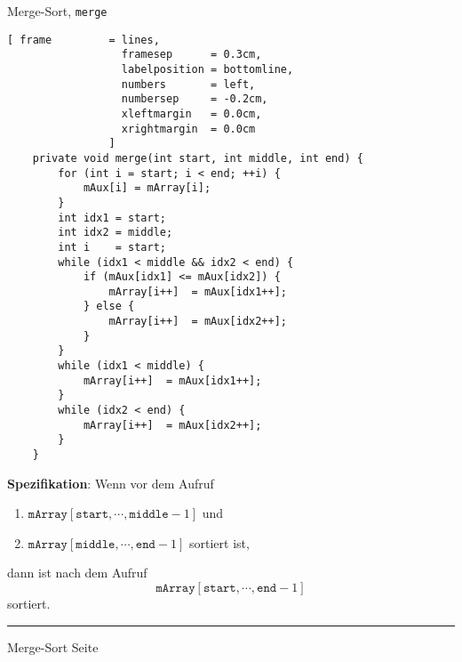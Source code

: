 \documentclass{slides}
\newcounter{mypage}
\begin{document}

\begin{slide}{}
\normalsize

\begin{center}
Merge-Sort,  \texttt{merge}
\end{center}

\footnotesize
\begin{Verbatim}[ frame         = lines, 
                  framesep      = 0.3cm, 
                  labelposition = bottomline,
                  numbers       = left,
                  numbersep     = -0.2cm,
                  xleftmargin   = 0.0cm,
                  xrightmargin  = 0.0cm
                ]
    private void merge(int start, int middle, int end) {    
        for (int i = start; i < end; ++i) {
            mAux[i] = mArray[i]; 
        }
        int idx1 = start;
        int idx2 = middle;
        int i    = start;
        while (idx1 < middle && idx2 < end) {
            if (mAux[idx1] <= mAux[idx2]) {
                mArray[i++]  = mAux[idx1++]; 
            } else {
                mArray[i++]  = mAux[idx2++]; 
            }
        }
        while (idx1 < middle) {
            mArray[i++]  = mAux[idx1++];
        }
        while (idx2 < end) {
            mArray[i++]  = mAux[idx2++];  
        }
    }
\end{Verbatim}

\textbf{Spezifikation}:
Wenn vor dem Aufruf
\begin{enumerate}
\item $\mathtt{mArray}[\mathtt{start}, \cdots, \mathtt{middle}-1]$ und
\item $\mathtt{mArray}[\mathtt{middle}, \cdots, \mathtt{end}-1]$ sortiert ist,
\end{enumerate}
dann ist nach dem Aufruf
\[ \mathtt{mArray}[\mathtt{start}, \cdots, \mathtt{end}-1] \] sortiert.

\vspace*{\fill}
\tiny \addtocounter{mypage}{1}
\rule{17cm}{1mm}
Merge-Sort \hspace*{\fill} Seite 
\end{slide}
\end{document}
